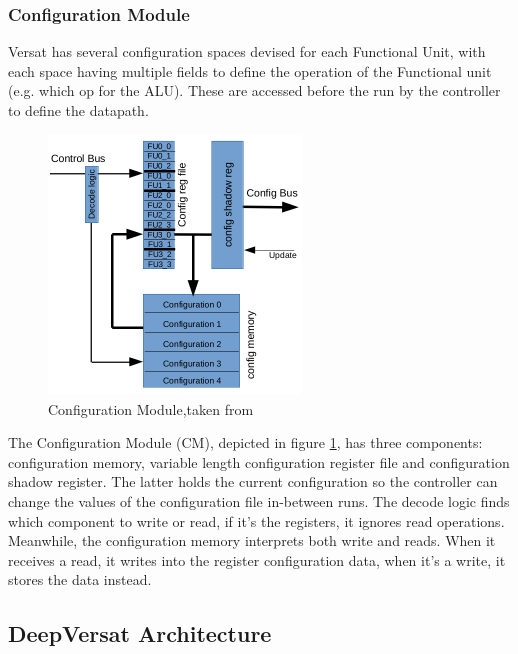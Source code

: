\subsubsection{Configuration Module}
\quad Versat has several configuration spaces devised for each Functional Unit,
with each space having multiple fields to define the operation of the Functional unit (e.g. which op for the ALU).
These are accessed before the run by the controller to define the datapath.

\begin{figure}[!htbp]
    \centering
    \includegraphics[width=0.6\textwidth]{Figures/conf.png}
    \caption{Configuration Module,taken from~\cite{sousa:controller}}
    \label{figure:conf}
\end{figure} 

The Configuration Module (CM), depicted in figure \ref{figure:conf}, 
has three components: configuration memory, variable length configuration register file 
and configuration shadow register.
The latter holds the current configuration so the controller can change the values of the configuration file in-between runs.
The decode logic finds which component to write or read, if it's the registers, it ignores read operations.
Meanwhile, the configuration memory interprets both write and reads. When it receives a read,
it writes into the register configuration data, when it's a write, it stores the data instead.


\newpage
\subsection{DeepVersat Architecture}


